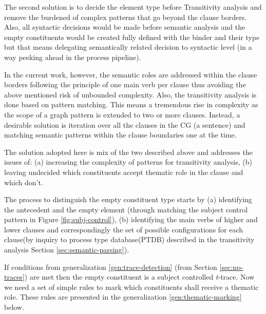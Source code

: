 The second solution is to decide the element type before Transitivity analysis and remove the burdened of complex patterns that go beyond the clause borders. Also, all syntactic decisions would be made before semantic analysis and the empty constituents would be created fully defined with the binder and their type but that means delegating semantically related decision to syntactic level (in a way peeking ahead in the process pipeline).

In the current work, however, the semantic roles are addressed within the clause borders following the principle of one main verb per clause thus avoiding the above mentioned risk of unbounded complexity. Also, the transitivity analysis is done based on pattern matching. This means a tremendous rise in complexity as the scope of a graph pattern is extended to two or more clauses. Instead, a desirable solution is iteration over all the clauses in the CG (a sentence) and matching semantic patterns within the clause boundaries one at the time.

The solution adopted here is mix of the two described above and addresses the issues of: (a) increasing the complexity of patterns for transitivity analysis, (b) leaving undecided which constituents accept thematic role in the clause and which don't. 

The process to distinguish the empty constituent type starts by (a) identifying the antecedent and the empty element (through matching the subject control pattern in Figure \ref{fig:subj-control}), (b) identifying the main verbs of higher and lower clauses and correspondingly the set of possible configurations for each clause(by inquiry to process type database(PTDB) described in the transitivity analysis Section \ref{sec:semantic-parsing}).

If conditions from generalization \ref{gen:trace-detection} (from Section \ref{sec:np-traces}) are met then the empty constituent is a subject controlled \textit{t}-trace. Now we need a set of simple rules to mark which constituents shall receive a thematic role. These rules are  presented in the generalization \ref{gen:thematic-marking} below.

